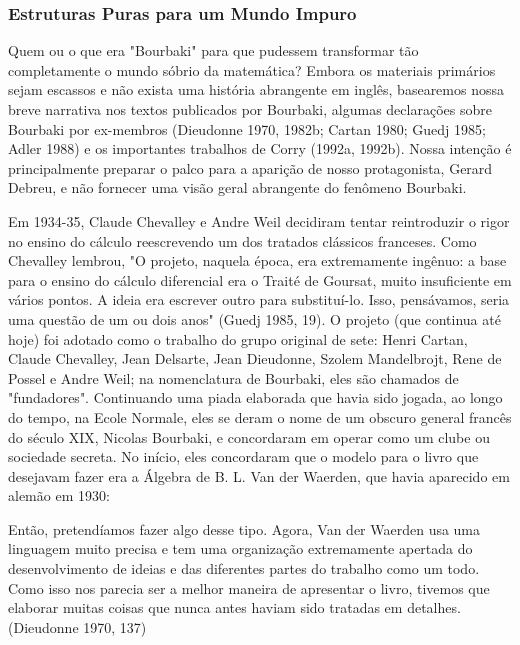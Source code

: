 \documentclass[a4paper,12pt]{article}[abntex2]
\begin{document}
\subsubsection{\textbf{Estruturas Puras para um Mundo Impuro}}
Quem ou o que era "Bourbaki" para que pudessem transformar tão completamente o mundo sóbrio da matemática? Embora os materiais primários sejam escassos e não exista uma história abrangente em inglês, basearemos nossa breve narrativa nos textos publicados por Bourbaki, algumas declarações sobre Bourbaki por ex-membros (Dieudonne 1970, 1982b; Cartan 1980; Guedj 1985; Adler 1988) e os importantes trabalhos de Corry (1992a, 1992b). Nossa intenção é principalmente preparar o palco para a aparição de nosso protagonista, Gerard Debreu, e não fornecer uma visão geral abrangente do fenômeno Bourbaki.

Em 1934-35, Claude Chevalley e Andre Weil decidiram tentar reintroduzir o rigor no ensino do cálculo reescrevendo um dos tratados clássicos franceses. Como Chevalley lembrou, "O projeto, naquela época, era extremamente ingênuo: a base para o ensino do cálculo diferencial era o Traité de Goursat, muito insuficiente em vários pontos. A ideia era escrever outro para substituí-lo. Isso, pensávamos, seria uma questão de um ou dois anos" (Guedj 1985, 19). O projeto (que continua até hoje) foi adotado como o trabalho do grupo original de sete: Henri Cartan, Claude Chevalley, Jean Delsarte, Jean Dieudonne, Szolem Mandelbrojt, Rene de Possel e Andre Weil; na nomenclatura de Bourbaki, eles são chamados de "fundadores". Continuando uma piada elaborada que havia sido jogada, ao longo do tempo, na Ecole Normale, eles se deram o nome de um obscuro general francês do século XIX, Nicolas Bourbaki, e concordaram em operar como um clube ou sociedade secreta. No início, eles concordaram que o modelo para o livro que desejavam fazer era a Álgebra de B. L. Van der Waerden, que havia aparecido em alemão em 1930:

Então, pretendíamos fazer algo desse tipo. Agora, Van der Waerden usa uma linguagem muito precisa e tem uma organização extremamente apertada do desenvolvimento de ideias e das diferentes partes do trabalho como um todo. Como isso nos parecia ser a melhor maneira de apresentar o livro, tivemos que elaborar muitas coisas que nunca antes haviam sido tratadas em detalhes. (Dieudonne 1970, 137)
\end{document}

